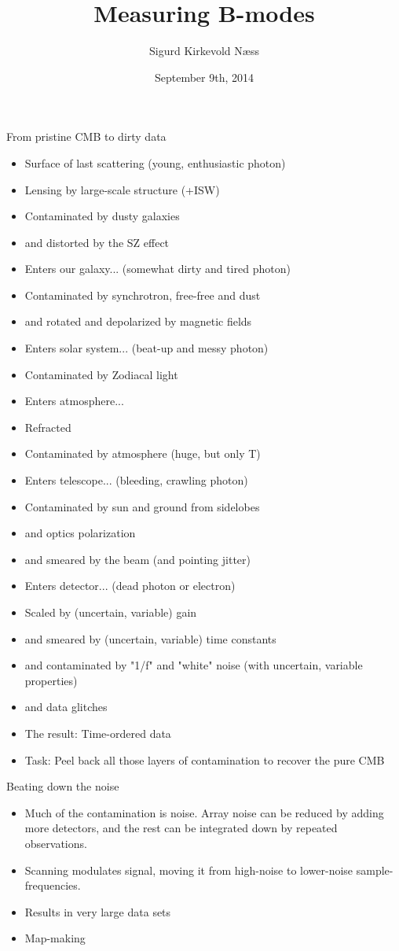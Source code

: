 \documentclass{beamer}
\title{Measuring B-modes}
\author{Sigurd Kirkevold Næss}
\institute{Subdepartment of astrophysics, Oxford University}
\date{September 9th, 2014}
\begin{document}
\begin{frame}
	\titlepage
\end{frame}

\begin{frame}{From pristine CMB to dirty data}
	\begin{itemize}
		\item Surface of last scattering (young, enthusiastic photon)
		\item Lensing by large-scale structure (+ISW)
		\item Contaminated by dusty galaxies
		\item and distorted by the SZ effect
		\item Enters our galaxy... (somewhat dirty and tired photon)
		\item Contaminated by synchrotron, free-free and dust
		\item and rotated and depolarized by magnetic fields
		\item Enters solar system... (beat-up and messy photon)
		\item Contaminated by Zodiacal light
		\item Enters atmosphere...
		\item Refracted
		\item Contaminated by atmosphere (huge, but only T)
		\item Enters telescope... (bleeding, crawling photon)
		\item Contaminated by sun and ground from sidelobes
		\item and optics polarization
		\item and smeared by the beam (and pointing jitter)
		\item Enters detector... (dead photon or electron)
		\item Scaled by (uncertain, variable) gain
		\item and smeared by (uncertain, variable) time constants
		\item and contaminated by "1/f" and "white" noise (with uncertain, variable properties)
		\item and data glitches
		\item The result: Time-ordered data
		\item Task: Peel back all those layers of contamination to recover the pure CMB
	\end{itemize}
\end{frame}

\begin{frame}{Beating down the noise}
	\begin{itemize}
		\item Much of the contamination is noise. Array noise can be reduced by
			adding more detectors, and the rest can be integrated down by repeated
			observations.
		\item Scanning modulates signal, moving it from high-noise to lower-noise
			sample-frequencies.
		\item Results in very large data sets
		\item Map-making
	\end{itemize}
\end{frame}
\end{document}

